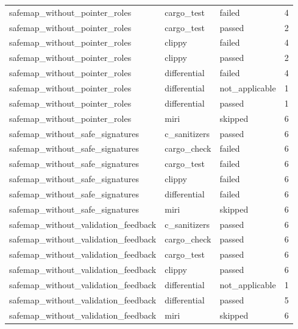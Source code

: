 \begin{table}[t]
\begin{tabular}{lllr}
safemap\_without\_pointer\_roles & cargo\_test & failed & 4 \\
safemap\_without\_pointer\_roles & cargo\_test & passed & 2 \\
safemap\_without\_pointer\_roles & clippy & failed & 4 \\
safemap\_without\_pointer\_roles & clippy & passed & 2 \\
safemap\_without\_pointer\_roles & differential & failed & 4 \\
safemap\_without\_pointer\_roles & differential & not\_applicable & 1 \\
safemap\_without\_pointer\_roles & differential & passed & 1 \\
safemap\_without\_pointer\_roles & miri & skipped & 6 \\
safemap\_without\_safe\_signatures & c\_sanitizers & passed & 6 \\
safemap\_without\_safe\_signatures & cargo\_check & failed & 6 \\
safemap\_without\_safe\_signatures & cargo\_test & failed & 6 \\
safemap\_without\_safe\_signatures & clippy & failed & 6 \\
safemap\_without\_safe\_signatures & differential & failed & 6 \\
safemap\_without\_safe\_signatures & miri & skipped & 6 \\
safemap\_without\_validation\_feedback & c\_sanitizers & passed & 6 \\
safemap\_without\_validation\_feedback & cargo\_check & passed & 6 \\
safemap\_without\_validation\_feedback & cargo\_test & passed & 6 \\
safemap\_without\_validation\_feedback & clippy & passed & 6 \\
safemap\_without\_validation\_feedback & differential & not\_applicable & 1 \\
safemap\_without\_validation\_feedback & differential & passed & 5 \\
safemap\_without\_validation\_feedback & miri & skipped & 6 \\
\hline
\end{tabular}
\end{table}

